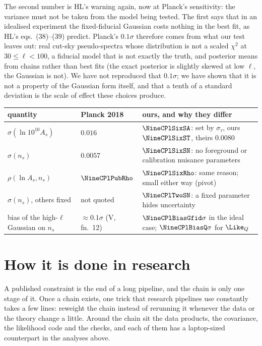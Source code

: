 The second number is HL's warning again, now at Planck's sensitivity: the variance must not be taken from the model
being tested. The first says that in an idealised experiment the fixed-fiducial Gaussian costs nothing in the
best fit, as HL's eqs.~(38)--(39) predict. Planck's $0.1\sigma$ therefore comes from what our test leaves out: real
cut-sky pseudo-spectra whose distribution is not a scaled $\chi^2$ at $30\le\ell<100$, a fiducial model that is not
exactly the truth, and posterior means from chains rather than best fits (the exact posterior is slightly skewed
at low $\ell$, the Gaussian is not). We have not reproduced that $0.1\sigma$; we have shown that it is not a property of
the Gaussian form itself, and that a tenth of a standard deviation is the scale of effect these choices produce.

\begin{center}
\small
\renewcommand{\arraystretch}{1.15}
\begin{tabularx}{\linewidth}{@{}>{\raggedright\arraybackslash}p{3.6cm}>{\raggedright\arraybackslash}p{2.4cm}>{\raggedright\arraybackslash}X@{}}
\toprule
quantity & Planck 2018 & ours, and why they differ\\\midrule
$\sigma(\ln10^{10}A_s)$ & $0.016$ & $\NineCPlSixSA$: set by $\sigma_\tau$, ours $\NineCPlSixST$, theirs $0.0080$\\
$\sigma(n_s)$ & $0.0057$ & $\NineCPlSixSN$: no foreground or calibration nuisance parameters\\
$\rho(\ln A_s,n_s)$ & $\NineCPlPubRho$ & $\NineCPlSixRho$: same reason; small either way (pivot)\\
$\sigma(n_s)$, others fixed & not quoted & $\NineCPlTwoSN$: a fixed parameter hides uncertainty\\
bias of the high-$\ell$ Gaussian on $n_s$ & $\approx0.1\sigma$ (V, fn.~12) & $\NineCPlBiasGfid\sigma$ in the ideal case; $\NineCPlBiasQ\sigma$ for $\Like_Q$\\
\bottomrule
\end{tabularx}
\end{center}
\section{How it is done in research}
\label{9c:sec:research}

A published constraint is the end of a long pipeline, and the chain is only one stage of it. Once a chain exists,
one trick that research pipelines use constantly takes a few lines: reweight the chain instead of rerunning it
whenever the data or the theory change a little. Around the chain sit the data products, the covariance, the
likelihood code and the checks, and each of them has a laptop-sized counterpart in the analyses above.

